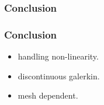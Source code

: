 \documentclass[serif,mathserif]{beamer}
\begin{document}
\begin{frame}
 \frametitle{Conclusion}
\end{frame}

\begin{frame}
  \frametitle{Conclusion}
  \begin{itemize}
   \item handling non-linearity.
   \item discontinuous galerkin.
   \item mesh dependent.
  \end{itemize}
\end{frame}
\end{document}
